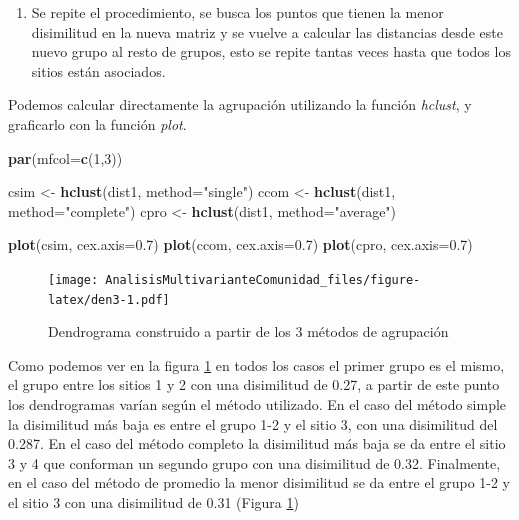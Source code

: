 \documentclass[]{book}
\newenvironment{Shaded}{\begin{snugshade}}{\end{snugshade}}
\newcommand{\KeywordTok}[1]{\textcolor[rgb]{0.13,0.29,0.53}{\textbf{{#1}}}}
\newcommand{\DataTypeTok}[1]{\textcolor[rgb]{0.13,0.29,0.53}{{#1}}}
\newcommand{\DecValTok}[1]{\textcolor[rgb]{0.00,0.00,0.81}{{#1}}}
\newcommand{\FloatTok}[1]{\textcolor[rgb]{0.00,0.00,0.81}{{#1}}}
\newcommand{\StringTok}[1]{\textcolor[rgb]{0.31,0.60,0.02}{{#1}}}
\newcommand{\NormalTok}[1]{{#1}}
\providecommand{\tightlist}{%
  \setlength{\itemsep}{0pt}\setlength{\parskip}{0pt}}
\begin{document}
\begin{enumerate}
\def\labelenumi{\arabic{enumi}.}
\setcounter{enumi}{3}
\tightlist
\item
  Se repite el procedimiento, se busca los puntos que tienen la menor
  disimilitud en la nueva matriz y se vuelve a calcular las distancias
  desde este nuevo grupo al resto de grupos, esto se repite tantas veces
  hasta que todos los sitios están asociados.
\end{enumerate}

Podemos calcular directamente la agrupación utilizando la función
\emph{hclust}, y graficarlo con la función \emph{plot}.

\begin{Shaded}
\begin{Highlighting}[]
\KeywordTok{par}\NormalTok{(}\DataTypeTok{mfcol=}\KeywordTok{c}\NormalTok{(}\DecValTok{1}\NormalTok{,}\DecValTok{3}\NormalTok{))}

\NormalTok{csim <-}\StringTok{ }\KeywordTok{hclust}\NormalTok{(dist1, }\DataTypeTok{method=}\StringTok{"single"}\NormalTok{)}
\NormalTok{ccom <-}\StringTok{ }\KeywordTok{hclust}\NormalTok{(dist1, }\DataTypeTok{method=}\StringTok{"complete"}\NormalTok{)}
\NormalTok{cpro <-}\StringTok{ }\KeywordTok{hclust}\NormalTok{(dist1, }\DataTypeTok{method=}\StringTok{"average"}\NormalTok{)}

\KeywordTok{plot}\NormalTok{(csim, }\DataTypeTok{cex.axis=}\FloatTok{0.7}\NormalTok{)}
\KeywordTok{plot}\NormalTok{(ccom, }\DataTypeTok{cex.axis=}\FloatTok{0.7}\NormalTok{)}
\KeywordTok{plot}\NormalTok{(cpro, }\DataTypeTok{cex.axis=}\FloatTok{0.7}\NormalTok{)}
\end{Highlighting}
\end{Shaded}

\begin{figure}[htbp]
\centering
\texttt{[image: AnalisisMultivarianteComunidad\_files/figure-latex/den3-1.pdf]}
\caption{\label{fig:den3}Dendrograma construido a partir de los 3 métodos de
agrupación}
\end{figure}

Como podemos ver en la figura \ref{fig:den3} en todos los casos el
primer grupo es el mismo, el grupo entre los sitios 1 y 2 con una
disimilitud de 0.27, a partir de este punto los dendrogramas varían
según el método utilizado. En el caso del método simple la disimilitud
más baja es entre el grupo 1-2 y el sitio 3, con una disimilitud del
0.287. En el caso del método completo la disimilitud más baja se da
entre el sitio 3 y 4 que conforman un segundo grupo con una disimilitud
de 0.32. Finalmente, en el caso del método de promedio la menor
disimilitud se da entre el grupo 1-2 y el sitio 3 con una disimilitud de
0.31 (Figura \ref{fig:den3})
\end{document}
